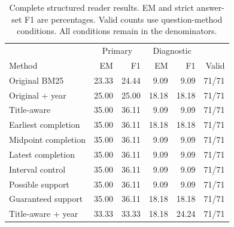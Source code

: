 \begin{table}[t]
\centering\small
\begin{tabular}{@{}lrrrrr@{}}
\toprule
 & \multicolumn{2}{c}{Primary} & \multicolumn{2}{c}{Diagnostic} & \\
Method & EM & F1 & EM & F1 & Valid\\
\midrule
Original BM25 & 23.33 & 24.44 & 9.09 & 9.09 & 71/71\\
Original + year & 25.00 & 25.00 & 18.18 & 18.18 & 71/71\\
Title-aware & 35.00 & 36.11 & 9.09 & 9.09 & 71/71\\
Earliest completion & 35.00 & 36.11 & 18.18 & 18.18 & 71/71\\
Midpoint completion & 35.00 & 36.11 & 9.09 & 9.09 & 71/71\\
Latest completion & 35.00 & 36.11 & 9.09 & 9.09 & 71/71\\
Interval control & 35.00 & 36.11 & 9.09 & 9.09 & 71/71\\
Possible support & 35.00 & 36.11 & 9.09 & 9.09 & 71/71\\
Guaranteed support & 35.00 & 36.11 & 18.18 & 18.18 & 71/71\\
Title-aware + year & 33.33 & 33.33 & 18.18 & 24.24 & 71/71\\
\bottomrule
\end{tabular}
\caption{Complete structured reader results. EM and strict answer-set F1 are percentages. Valid counts use question-method conditions. All conditions remain in the denominators.}
\label{tab:reader-structured}
\end{table}
